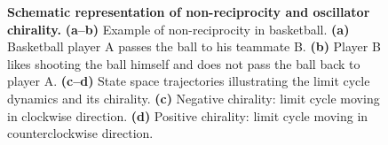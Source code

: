 \documentclass[11pt, a4paper]{article} %
\begin{document}
\begin{figure}[htbp]
\caption{\textbf{Schematic representation of non-reciprocity and oscillator chirality.}
    \textbf{(a--b)} Example of non-reciprocity in basketball. 
    \textbf{(a)} Basketball player A passes the ball to his teammate B. 
    \textbf{(b)} Player B likes shooting the ball himself and does not pass the ball back to player A. 
    \textbf{(c--d)} State space trajectories illustrating the limit cycle dynamics and its chirality. 
    \textbf{(c)} Negative chirality: limit cycle moving in clockwise direction. 
    \textbf{(d)} Positive chirality: limit cycle moving in counterclockwise direction. }
\label{fig:non-reciprocity}
\end{figure}
\end{document}

